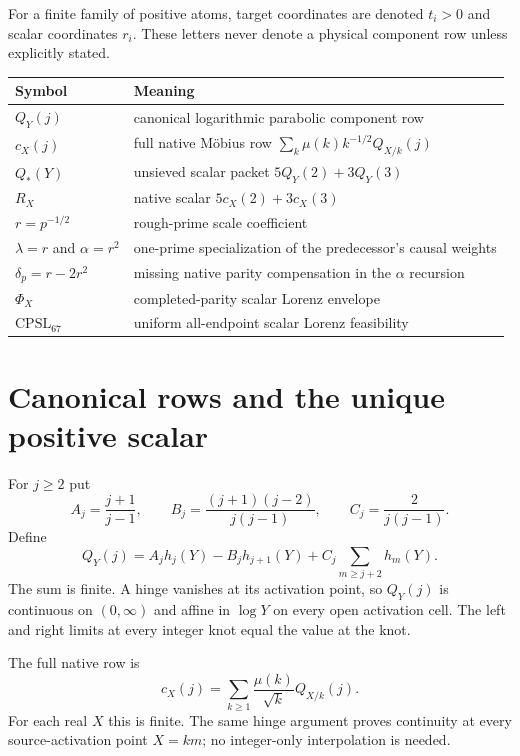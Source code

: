 \documentclass[11pt]{article}
\newcommand{\CPSL}{\mathrm{CPSL}_{67}}
\newcommand{\1}{\mathbf 1}
\begin{document}
For a finite family of positive atoms, target coordinates are denoted $t_i>0$ and scalar coordinates $r_i$.  These letters never denote a physical component row unless explicitly stated.

\begin{longtable}{p{}p{}}
\toprule
Symbol & Meaning\\
\midrule
$Q_Y(j)$ & canonical logarithmic parabolic component row\\
$c_X(j)$ & full native M\"obius row $\sum_k\mu(k)k^{-1/2}Q_{X/k}(j)$\\
$Q_*(Y)$ & unsieved scalar packet $5Q_Y(2)+3Q_Y(3)$\\
$R_X$ & native scalar $5c_X(2)+3c_X(3)$\\
$r=p^{-1/2}$ & rough-prime scale coefficient\\
$\lambda=r$ and $\alpha=r^2$ & one-prime specialization of the predecessor's causal weights\\
$\delta_p=r-2r^2$ & missing native parity compensation in the $\alpha$ recursion\\
$\Phi_X$ & completed-parity scalar Lorenz envelope\\
$\CPSL$ & uniform all-endpoint scalar Lorenz feasibility\\
\bottomrule
\end{longtable}

\section{Canonical rows and the unique positive scalar}

For $j\ge2$ put
\[
A_j=\frac{j+1}{j-1},\qquad
B_j=\frac{(j+1)(j-2)}{j(j-1)},\qquad
C_j=\frac2{j(j-1)}.
\]
Define
\begin{equation}\label{eq:Q}
Q_Y(j)=A_jh_j(Y)-B_jh_{j+1}(Y)+C_j\sum_{m\ge j+2}h_m(Y).
\end{equation}
The sum is finite.  A hinge vanishes at its activation point, so $Q_Y(j)$ is continuous on $(0,\infty)$ and affine in $\log Y$ on every open activation cell.  The left and right limits at every integer knot equal the value at the knot.

The full native row is
\begin{equation}\label{eq:crow}
c_X(j)=\sum_{k\ge1}\frac{\mu(k)}{\sqrt k}Q_{X/k}(j).
\end{equation}
For each real $X$ this is finite.  The same hinge argument proves continuity at every source-activation point $X=km$; no integer-only interpolation is needed.
\end{document}
